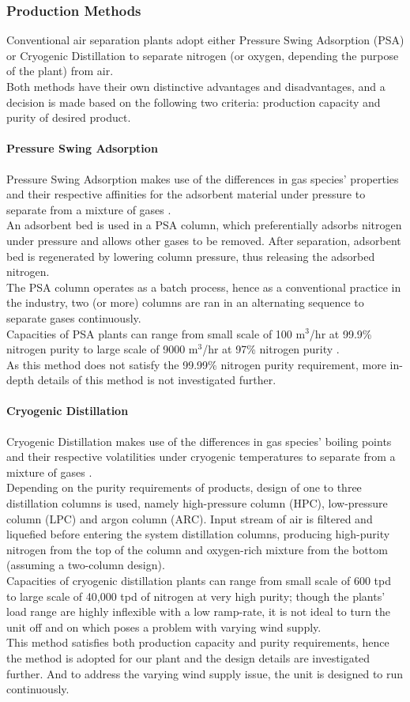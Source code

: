 \documentclass[11pt,oneside]{article}
\let\subsubsubsection\paragraph
\begin{document}
	\subsubsection{Production Methods} \noindent
    Conventional air separation plants adopt either Pressure Swing Adsorption (PSA) or Cryogenic Distillation to separate nitrogen (or oxygen, depending the purpose of the plant) from air. \\
    Both methods have their own distinctive advantages and disadvantages, and a decision  is made based on the following two criteria: production capacity and purity of desired product.  
		\subsubsubsection{Pressure Swing Adsorption}
        Pressure Swing Adsorption makes use of the differences in gas species' properties and their respective affinities for the adsorbent material under pressure to separate from a mixture of gases \citep{linde_PSA}. \\
        An adsorbent bed is used in a PSA column, which preferentially adsorbs nitrogen under pressure and allows other gases to be removed. After separation, adsorbent bed is regenerated by lowering column pressure, thus releasing the adsorbed nitrogen.\\
        The PSA column operates as a batch process, hence as a conventional practice in the industry, two  (or more) columns are ran in an alternating sequence to separate gases continuously.\\
        Capacities of PSA plants can range from small scale of 100 m$^3$/hr at 99.9\% nitrogen purity to large scale of 9000 m$^3$/hr at 97\% nitrogen purity \citep{PRISM}. \\
        As this method does not satisfy the 99.99\% nitrogen purity requirement, more in-depth details of this method is not investigated further.
		\subsubsubsection{Cryogenic Distillation}
        Cryogenic Distillation makes use of the differences in gas species' boiling points and their respective volatilities under cryogenic temperatures to separate from a mixture of gases \citep{linde_cryo}.\\
        Depending on the purity requirements of products, design of one to three distillation columns is used, namely high-pressure column (HPC), low-pressure column (LPC) and argon column (ARC). Input stream of air is filtered and liquefied before entering the system distillation columns, producing high-purity nitrogen from the top of the column and oxygen-rich mixture from the bottom (assuming a two-column design).\\
        Capacities of cryogenic distillation plants can range from small scale of 600 tpd to large scale of 40,000 tpd of nitrogen at very high purity; though the plants' load range are highly inflexible with a low ramp-rate, it is not ideal to turn the unit off and on which poses a problem with varying wind supply. \\
        This method satisfies both production capacity and purity requirements, hence the method is adopted for our plant and the design details are investigated further. And to address the varying wind supply issue, the unit is designed to run continuously.
\end{document}
